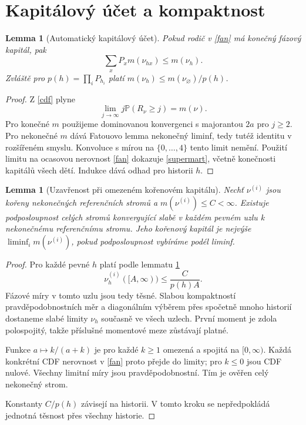 \documentclass[11pt,a4paper]{article}
\newtheorem{lemma}[theorem]{Lemma}
\newcommand{\Prb}{\mathbb P}
\begin{document}
\section{Kapitálový účet a kompaktnost}
\begin{lemma}[Automatický kapitálový účet]\label{capital}
Pokud rodič v \eqref{fan} má konečný fázový kapitál, pak
\begin{equation}\label{supermart}
\sum_xP_xm(\nu_{hx})\le m(\nu_h).
\end{equation}
Zvláště pro $p(h)=\prod_iP_{h_i}$ platí
$m(\nu_h)\le m(\nu_\varnothing)/p(h)$.
\end{lemma}
\begin{proof}
Z \eqref{cdf} plyne
\[
\lim_{j\to\infty}j\Prb(R_\nu\ge j)=m(\nu).
\]
Pro konečné $m$ použijeme dominovanou konvergenci s majorantou
$2a$ pro $j\ge2$. Pro nekonečné $m$ dává Fatouovo lemma nekonečný
liminf, tedy tutéž identitu v rozšířeném smyslu.
Konvoluce s mírou na $\{0,\ldots,4\}$ tento limit nemění.
Použití limitu na ocasovou nerovnost \eqref{fan} dokazuje
\eqref{supermart}, včetně konečnosti kapitálů všech dětí.
Indukce dává odhad pro historii $h$.
\end{proof}

\begin{lemma}[Uzavřenost při omezeném kořenovém kapitálu]\label{closed}
Nechť $\nu^{(i)}$ jsou kořeny nekonečných referenčních stromů
a $m(\nu^{(i)})\le C<\infty$. Existuje podposloupnost celých stromů
konvergující slabě v každém pevném uzlu k nekonečnému referenčnímu
stromu. Jeho kořenový kapitál je nejvýše
$\liminf_i m(\nu^{(i)})$, pokud podposloupnost vybíráme podél liminf.
\end{lemma}
\begin{proof}
Pro každé pevné $h$ platí podle lemmatu \ref{capital}
\[
\nu_h^{(i)}([A,\infty))\le\frac{C}{p(h)A}.
\]
Fázové míry v tomto uzlu jsou tedy těsné. Slabou kompaktností
pravděpodobnostních měr a diagonálním výběrem přes spočetně mnoho
historií dostaneme slabé limity $\nu_h$ současně ve všech uzlech.
První moment je zdola polospojitý, takže příslušné momentové meze
zůstávají platné.

Funkce $a\mapsto k/(a+k)$ je pro každé $k\ge1$ omezená a spojitá
na $[0,\infty)$. Každá konkrétní CDF nerovnost v \eqref{fan} proto
přejde do limity; pro $k\le0$ jsou CDF nulové.
Všechny limitní míry jsou pravděpodobnostní. Tím je ověřen celý
nekonečný strom.

Konstanty $C/p(h)$ závisejí na historii. V tomto kroku se
nepředpokládá jednotná těsnost přes všechny historie.
\end{proof}
\end{document}

